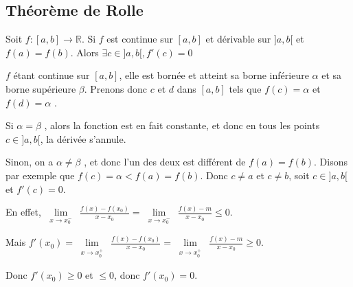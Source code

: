 \documentclass[french]{yLectureNote}
\newcommand{\Lim}[1]{\lim\limits_{\substack{#1}}\:}
\begin{document}
\subsection{Théorème de Rolle}
\begin{theorem}
Soit $f:[a,b]\to \mathbb{R}$. Si $f$ est continue sur $[a,b]$ et dérivable sur $]a,b[$ et $f(a) = f(b)$. Alors $\exists c\in]a,b[, f'(c) = 0$
\end{theorem}

\begin{myproof}
$f$ étant continue sur $[a, b]$, elle est bornée et atteint
sa borne inférieure $\alpha$ et sa borne supérieure $\beta$. Prenons
donc $c$ et $d$ dans $[a, b]$ tels que $f (c) = \alpha$ et $f (d) = \alpha$ .

Si $\alpha = \beta$ , alors la fonction est en fait constante, et donc en tous les points $c\in ]a, b[$, la dérivée s’annule.

Sinon, on a $\alpha \neq \beta$ , et donc l’un des deux est différent de $f (a) = f (b)$. Disons par exemple
que $f (c) = \alpha < f (a) = f (b)$. Donc $c \neq a$ et $c \neq b$, soit $c \in ]a, b[$ et $f'(c) = 0$.

En effet,
$\Lim{x\to x_0^-} \frac{f(x)-f(x_0)}{x-x_0} = \Lim{x\to x_0^-} \frac{f(x)-m}{x-x_0} \leq 0$.

Mais $f'(x_0) = \Lim{x\to x_0^+} \frac{f(x)-f(x_0)}{x-x_0} = \Lim{x\to x_0^+} \frac{f(x)-m}{x-x_0} \geq 0$.

Donc $f'(x_0) \geq 0 $ et $\leq 0$, donc $f'(x_0) = 0$.
\end{myproof}
\end{document}
